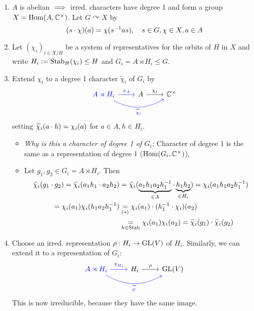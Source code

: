 \documentclass[a4paper]{article}
\begin{document}
\begin{enumerate}
  \item $A$ is abelian $\implies$ irred. characters have degree 1 and form a group $X = \operatorname{Hom}(A,\mathbb C^\times)$. Let $G \curvearrowright X$ by \[(s \cdot \chi)(a) = \chi(s^{-1} a s), \quad s \in G, \chi \in X, a \in A\]
  \item Let $(\chi_{i})_{i \in X/H}$ be a system of representatives for the orbits of $H$ in $X$ and write $H_{i} := \operatorname{Stab}_{H}(\chi_{i}) \le H$ and $G_{i} = A \rtimes H_{i} \le G$.
  \item Extend $\chi_{i}$ to a degree 1 character $\tilde \chi_{i}$ of $G_{i}$ by
\[\begin{tikzcd}
\color{blue}A \rtimes H_i \arrow[r, "\pi_A", blue] \arrow[rr, "\tilde \chi_i"', bend right, blue] & A \arrow[r, "\chi_i"] & \mathbb C\en
\end{tikzcd}\]
        setting $\widetilde \chi_{i}(a\cdot h) = \chi_{i}(a)$ for $a \in A, h \in H_{i}$.
        \begin{itemize}
          \item \emph{Why is this a character of degree 1 of $G_{i}$:} Character of degree 1 is the same as a representation of degree 1 ($\operatorname{Hom}(G_{i}, \mathbb C^\times)$),
                \item
                Let $g_{1}, g_{2} \in G_{i} = A \rtimes H_{i}$. Then
                \begin{align*}
                \widetilde \chi_{i}(g_{1}\cdot g_{2}) = \widetilde \chi_{i}(a_{1}h_{1}\cdot a_{2}h_{2}) &= \widetilde \chi_{i}(\underbrace{a_{1}h_{1}a_{2}h_{1}^{-1}}_{\in A}\cdot \underbrace{h_{1}h_{2}}_{\in H_{i}}) = \chi_{i}(a_{1}h_{1}a_{2}h_{1}^{-1}) \\
                  = \chi_{i}(a_{1})\chi_{i}(h_{1}a_{2}h_{1}^{-1}) &\underset{(*)}= \chi_{i}(a_{1})\cdot (h_{1}^{-1}\cdot \chi_{i})(a_{2}) \\
                  &\underset{h \in \operatorname{Stab}}= \chi_{i}(a_{1})\chi_{i}(a_{2}) = \widetilde \chi_{i}(g_{1}) \cdot \widetilde \chi_{i}(g_{2})
                \end{align*}
        \end{itemize}
  \item Choose an irred. representation $\rho: H_{i} \to \operatorname{GL}(V)$ of $H_{i}$. Similarly, we can extend it to a representation of $G_{i}$:
\[\begin{tikzcd}
\color{blue}A \rtimes H_i \arrow[r, "\pi_{H_{i}}", blue] \arrow[rr, "\tilde \rho"', bend right, blue] & H_{i} \arrow[r, "\rho"] & \mathbb \GL(V)
\end{tikzcd}\]
        This is now irreducible, because they have the same image.

\end{enumerate}
\end{document}

